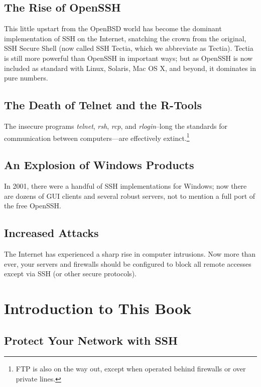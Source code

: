 \documentclass[12pt]{book}
\begin{document}
\section{The Rise of OpenSSH}

This little upstart from the OpenBSD world has become the dominant implementation of SSH on the Internet, snatching the crown from the original, SSH Secure Shell (now called SSH Tectia, which we abbreviate as Tectia). Tectia is still more powerful than OpenSSH in important ways; but as OpenSSH is now included as standard with Linux, Solaris, Mac OS X, and beyond, it dominates in pure numbers.

\section{The Death of Telnet and the R-Tools}

The insecure programs \textit{telnet}, \textit{rsh}, \textit{rcp}, and \textit{rlogin}--long the standards for communication between computers---are effectively extinct.\footnote{FTP is also on the way out, except when operated behind firewalls or over private lines.}

\section{An Explosion of Windows Products}

In 2001, there were a handful of SSH implementations for Windows; now there are dozens of GUI clients and several robust servers, not to mention a full port of the free OpenSSH.

\section{Increased Attacks}

The Internet has experienced a sharp rise in computer intrusions. Now more than ever, your servers and firewalls should be configured to block all remote accesses except via SSH (or other secure protocols).

\chapter{Introduction to This Book}

\section{Protect Your Network with SSH}
\end{document}
